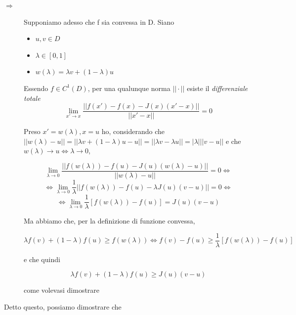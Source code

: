 \begin{thproof}
\begin{description}
\item[$ \Rightarrow $] Supponiamo adesso che f sia convessa in D. Siano
\begin{itemize}
\item $ u,v \in D $
\item $ \lambda \in [0,1] $
\item $ w(\lambda) = \lambda v + (1 - \lambda) u $
\end{itemize}

Essendo $ f \in C^1(D) $, per una qualunque norma $ ||\cdot || $ esiste il \emph{differenziale totale}
\[ \lim_{x' \rightarrow x} \dfrac{|| f(x') - f(x) - J(x)(x' - x) ||}{|| x' - x ||} = 0 \]

Preso $ x' = w(\lambda), x = u $ ho, considerando che $ || w(\lambda) - u || = || \lambda v + (1 - \lambda) u - u || = || \lambda v - \lambda u || = |\lambda| || v - u || $ e che $ w(\lambda) \rightarrow u \Leftrightarrow \lambda \rightarrow 0 $,

\[ \lim_{\lambda \rightarrow 0} \dfrac{|| f(w(\lambda)) - f(u) - J(u)(w(\lambda) - u) ||}{|| w(\lambda) - u ||} = 0 \Leftrightarrow \]
\[ \Leftrightarrow \lim_{\lambda \rightarrow 0} \frac{1}{\lambda} || f(w(\lambda)) - f(u) - \lambda J(u)(v - u) || = 0 \Leftrightarrow \]
\[ \Leftrightarrow \lim_{\lambda \rightarrow 0} \frac{1}{\lambda} \left[ f(w(\lambda)) - f(u) \right] = J(u)(v - u) \]

Ma abbiamo che, per la definizione di funzione convessa,

\[ \lambda f(v) + (1 - \lambda)f(u) \geq f(w(\lambda)) \Leftrightarrow f(v) - f(u) \geq \frac{1}{\lambda} \left[ f(w(\lambda)) - f(u) \right] \]

e che quindi

\[ \lambda f(v) + (1 - \lambda)f(u) \geq J(u)(v - u) \]

come volevasi dimostrare
\end{description}
\end{thproof}

Detto questo, possiamo dimostrare che

